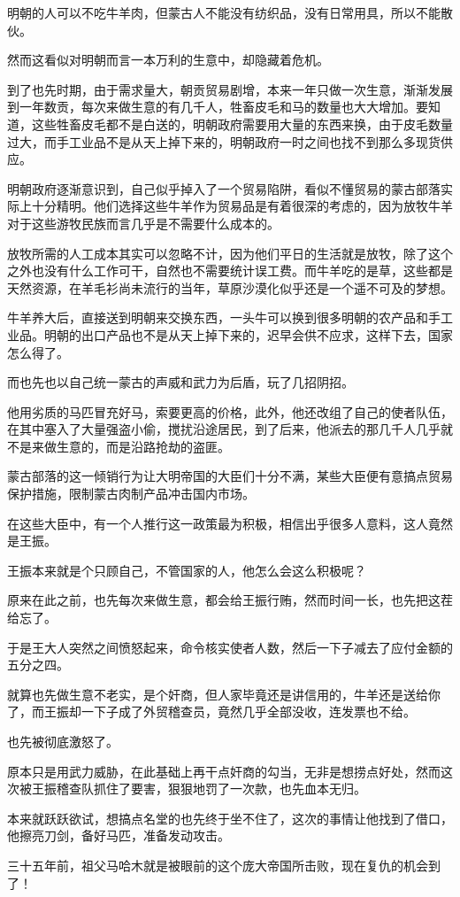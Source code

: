 \begin{multicols}{\theparacolNo}
明朝的人可以不吃牛羊肉，但蒙古人不能没有纺织品，没有日常用具，所以不能散伙。

然而这看似对明朝而言一本万利的生意中，却隐藏着危机。

到了也先时期，由于需求量大，朝贡贸易剧增，本来一年只做一次生意，渐渐发展到一年数贡，每次来做生意的有几千人，牲畜皮毛和马的数量也大大增加。要知道，这些牲畜皮毛都不是白送的，明朝政府需要用大量的东西来换，由于皮毛数量过大，而手工业品不是从天上掉下来的，明朝政府一时之间也找不到那么多现货供应。

明朝政府逐渐意识到，自己似乎掉入了一个贸易陷阱，看似不懂贸易的蒙古部落实际上十分精明。他们选择这些牛羊作为贸易品是有着很深的考虑的，因为放牧牛羊对于这些游牧民族而言几乎是不需要什么成本的。

放牧所需的人工成本其实可以忽略不计，因为他们平日的生活就是放牧，除了这个之外也没有什么工作可干，自然也不需要统计误工费。而牛羊吃的是草，这些都是天然资源，在羊毛衫尚未流行的当年，草原沙漠化似乎还是一个遥不可及的梦想。

牛羊养大后，直接送到明朝来交换东西，一头牛可以换到很多明朝的农产品和手工业品。明朝的出口产品也不是从天上掉下来的，迟早会供不应求，这样下去，国家怎么得了。

而也先也以自己统一蒙古的声威和武力为后盾，玩了几招阴招。

他用劣质的马匹冒充好马，索要更高的价格，此外，他还改组了自己的使者队伍，在其中塞入了大量强盗小偷，搅扰沿途居民，到了后来，他派去的那几千人几乎就不是来做生意的，而是沿路抢劫的盗匪。

蒙古部落的这一倾销行为让大明帝国的大臣们十分不满，某些大臣便有意搞点贸易保护措施，限制蒙古肉制产品冲击国内市场。

在这些大臣中，有一个人推行这一政策最为积极，相信出乎很多人意料，这人竟然是王振。

王振本来就是个只顾自己，不管国家的人，他怎么会这么积极呢？

原来在此之前，也先每次来做生意，都会给王振行贿，然而时间一长，也先把这茬给忘了。

于是王大人突然之间愤怒起来，命令核实使者人数，然后一下子减去了应付金额的五分之四。

就算也先做生意不老实，是个奸商，但人家毕竟还是讲信用的，牛羊还是送给你了，而王振却一下子成了外贸稽查员，竟然几乎全部没收，连发票也不给。

也先被彻底激怒了。

原本只是用武力威胁，在此基础上再干点奸商的勾当，无非是想捞点好处，然而这次被王振稽查队抓住了要害，狠狠地罚了一次款，也先血本无归。

本来就跃跃欲试，想搞点名堂的也先终于坐不住了，这次的事情让他找到了借口，他擦亮刀剑，备好马匹，准备发动攻击。

三十五年前，祖父马哈木就是被眼前的这个庞大帝国所击败，现在复仇的机会到了！
\ifnum{}
	\end{multicols}
\fi
\newpage
